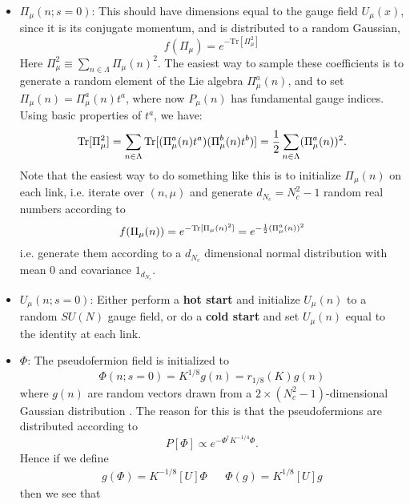 \begin{itemize}
	\item $\Pi_\mu(n; s = 0)$: This should have dimensions equal to the gauge field $U_\mu(x)$, since it is its conjugate momentum, and is distributed to a random Gaussian,
	\begin{equation}
		f(\Pi_\mu) = e^{-\mathrm{Tr}[\Pi_\mu^2]}
	\end{equation}
	Here $\Pi_\mu^2\equiv \sum_{n\in\Lambda} \Pi_\mu(n)^2$. The easiest way to sample these coefficients is to generate a random element of the Lie algebra $\Pi_\mu^a(n)$, and to set $\Pi_\mu(n) = \Pi_\mu^a(n) t^a$, where now $P_\mu(n)$ has fundamental gauge indices. Using basic properties of $t^a$, we have:
	\begin{equation}
		\mathrm{Tr}[\Pi_\mu^2] = \sum_{n\in\Lambda} \mathrm{Tr}[(\Pi_\mu^a(n) t^a)(\Pi_\mu^b(n) t^b)] = \frac{1}{2} \sum_{n\in\Lambda} (\Pi_\mu^a(n))^2.
	\end{equation}
	Note that the easiest way to do something like this is to initialize $\Pi_\mu(n)$ on each link, i.e. iterate over $(n, \mu)$ and generate $d_{N_c} = N_c^2 - 1$ random real numbers according to
	\begin{equation}
		f(\Pi_\mu(n)) = e^{-\mathrm{Tr} [\Pi_\mu(n)^2]} = e^{-\frac{1}{2} (\Pi_\mu^a(n))^2}
	\end{equation}
	i.e. generate them according to a $d_{N_c}$ dimensional normal distribution with mean 0 and covariance $1_{d_{N_c}}$. 
	\item $U_\mu(n; s = 0)$: Either perform a \textbf{hot start} and initialize $U_\mu(n)$ to a random $SU(N)$ gauge field, or do a \textbf{cold start} and set $U_\mu(n)$ equal to the identity at each link. 
	\item $\Phi$: The pseudofermion field is initialized to 
	\begin{equation}
		\Phi(n; s = 0) = K^{1/8} g(n) = r_{1/8}(K) g(n)
	\end{equation}
	where $g(n)$ are random vectors drawn from a $2\times (N_c^2 - 1)$-dimensional Gaussian distribution . The reason for this is that the pseudofermions are distributed according to
	\begin{equation}
		P[\Phi]\propto e^{-\Phi^\dagger K^{-1/4} \Phi}.
	\end{equation}
	Hence if we define 
	\begin{align}
		g(\Phi) = K^{-1/8}[U]\Phi && \Phi(g) = K^{1/8}[U] g
	\end{align}
	then we see that
	\begin{equation}

\end{equation}
\end{itemize}
